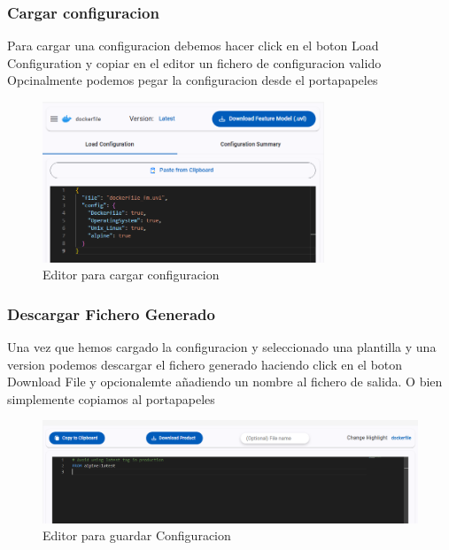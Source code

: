 \documentclass[12pt, a4paper, twoside]{article}
\begin{document}
\begin{umaappendices}
	\subsubsection{Cargar configuracion}
	Para cargar una configuracion debemos hacer click en el boton Load Configuration y copiar en el editor un fichero de configuracion valido
	Opcinalmente podemos pegar la configuracion desde el portapapeles
	\begin{figure}[h]
		\centering
			\includegraphics[width=0.75\textwidth]{loadconfiguration.png}
		\caption{Editor para cargar configuracion}
	\end{figure}
	\newpage

	\subsubsection{Descargar Fichero Generado}
	Una vez que hemos cargado la configuracion y seleccionado una plantilla y una version podemos descargar el fichero generado haciendo click en el boton Download File y opcionalemte añadiendo un nombre al fichero de salida. O bien simplemente copiamos al portapapeles
	\begin{figure}[h]
		\centering
			\includegraphics[width=1\textwidth]{donwloadToolbar.png}
		\caption{Editor para guardar Configuracion}
	\end{figure}


	\newpage

\end{umaappendices}
\end{document}

